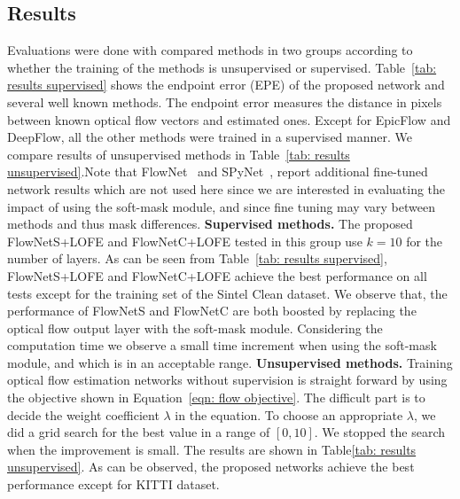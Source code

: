 \documentclass[10pt,twocolumn,letterpaper]{article}
\begin{document}
\subsection{Results}
Evaluations were done with compared methods in two groups according to whether the training of the methods is unsupervised or supervised. Table~\ref{tab: results supervised} shows the endpoint error (EPE) of the proposed network and several well known methods. The endpoint error measures the distance in pixels between known optical flow vectors and estimated ones. Except for EpicFlow and DeepFlow, all the other methods were trained in a supervised manner. We compare results of unsupervised methods in Table~\ref{tab: results unsupervised}.Note that FlowNet~\cite{Ilg_2017_CVPR} and SPyNet~\cite{Ranjan_2017_CVPR}, report additional fine-tuned network results which are not used here since we are interested in evaluating the impact of using the soft-mask module, and since fine tuning may vary between methods and thus mask differences.
\newline
\newline
\noindent \textbf{Supervised methods.} The proposed FlowNetS+LOFE and FlowNetC+LOFE tested in this group use $k=10$ for the number of layers. As can be seen from Table~\ref{tab: results supervised}, FlowNetS+LOFE and FlowNetC+LOFE achieve the best performance on all tests except for the training set of the Sintel Clean dataset. We observe that, the performance of FlowNetS and FlowNetC are both boosted by replacing the optical flow output layer with the soft-mask module. Considering the computation time we observe a small time increment when using the soft-mask module, and which is in an acceptable range. 
\newline
\newline
\noindent \textbf{Unsupervised methods.} Training optical flow estimation networks without supervision is straight forward by using the objective shown in Equation~\ref{eqn: flow objective}. The difficult part is to decide the weight coefficient $\lambda$ in the equation. To choose an appropriate $\lambda$, we did a grid search for the best value in a range of $[0, 10]$. We stopped the search when the improvement is small. The results are shown in Table\ref{tab: results unsupervised}. As can be observed, the proposed networks achieve the best performance except for KITTI dataset. 
\end{document}
